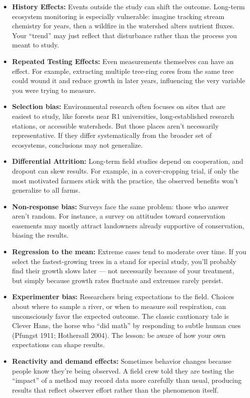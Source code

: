 \documentclass[
  letterpaper,
  DIV=11,
  numbers=noendperiod]{scrreprt}
\begin{document}
\begin{itemize}
\item
  \textbf{History Effects:} Events outside the study can shift the
  outcome. Long-term ecosystem monitoring is especially vulnerable:
  imagine tracking stream chemistry for years, then a wildfire in the
  watershed alters nutrient fluxes. Your ``trend'' may just reflect that
  disturbance rather than the process you meant to study.
\item
  \textbf{Repeated Testing Effects:} Even measurements themselves can
  have an effect. For example, extracting multiple tree-ring cores from
  the same tree could wound it and reduce growth in later years,
  influencing the very variable you were trying to measure.
\item
  \textbf{Selection bias:} Environmental research often focuses on sites
  that are easiest to study, like forests near R1 universities,
  long-established research stations, or accessible watersheds. But
  those places aren't necessarily representative. If they differ
  systematically from the broader set of ecosystems, conclusions may not
  generalize.
\item
  \textbf{Differential Attrition:} Long-term field studies depend on
  cooperation, and dropout can skew results. For example, in a
  cover-cropping trial, if only the most motivated farmers stick with
  the practice, the observed benefits won't generalize to all farms.
\item
  \textbf{Non-response bias:} Surveys face the same problem: those who
  answer aren't random. For instance, a survey on attitudes toward
  conservation easements may mostly attract landowners already
  supportive of conservation, biasing the results.
\item
  \textbf{Regression to the mean:} Extreme cases tend to moderate over
  time. If you select the fastest-growing trees in a stand for special
  study, you'll probably find their growth slows later --- not
  necessarily because of your treatment, but simply because growth rates
  fluctuate and extremes rarely persist.
\item
  \textbf{Experimenter bias:} Researchers bring expectations to the
  field. Choices about where to sample a river, or when to measure soil
  respiration, can unconsciously favor the expected outcome. The classic
  cautionary tale is Clever Hans, the horse who ``did math'' by
  responding to subtle human cues (Pfungst 1911; Hothersall 2004). The
  lesson: be aware of how your own expectations can shape results.
\item
  \textbf{Reactivity and demand effects:} Sometimes behavior changes
  because people know they're being observed. A field crew told they are
  testing the ``impact'' of a method may record data more carefully than
  usual, producing results that reflect observer effort rather than the
  phenomenon itself.
\end{itemize}
\end{document}
